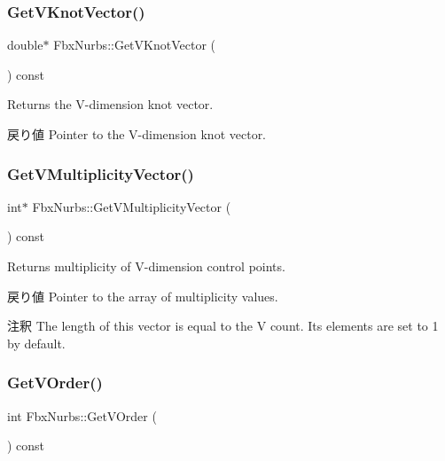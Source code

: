 \subsubsection{\texorpdfstring{Get\+V\+Knot\+Vector()}{GetVKnotVector()}}
{\footnotesize\ttfamily double$\ast$ Fbx\+Nurbs\+::\+Get\+V\+Knot\+Vector (\begin{DoxyParamCaption}{ }\end{DoxyParamCaption}) const}

Returns the V-\/dimension knot vector. \begin{DoxyReturn}{戻り値}
Pointer to the V-\/dimension knot vector. 
\end{DoxyReturn}
\mbox{\label{class_fbx_nurbs_a02bdc93c80499e43de757d4772270dac}} 
\subsubsection{\texorpdfstring{Get\+V\+Multiplicity\+Vector()}{GetVMultiplicityVector()}}
{\footnotesize\ttfamily int$\ast$ Fbx\+Nurbs\+::\+Get\+V\+Multiplicity\+Vector (\begin{DoxyParamCaption}{ }\end{DoxyParamCaption}) const}

Returns multiplicity of V-\/dimension control points. \begin{DoxyReturn}{戻り値}
Pointer to the array of multiplicity values. 
\end{DoxyReturn}
\begin{DoxyRemark}{注釈}
The length of this vector is equal to the V count. Its elements are set to 1 by default. 
\end{DoxyRemark}
\mbox{\label{class_fbx_nurbs_a7c7aff46a8e42db3d788f5a4c4d50797}} 
\subsubsection{\texorpdfstring{Get\+V\+Order()}{GetVOrder()}}
{\footnotesize\ttfamily int Fbx\+Nurbs\+::\+Get\+V\+Order (\begin{DoxyParamCaption}{ }\end{DoxyParamCaption}) const\hspace{0.3cm}{\ttfamily [inline]}}

